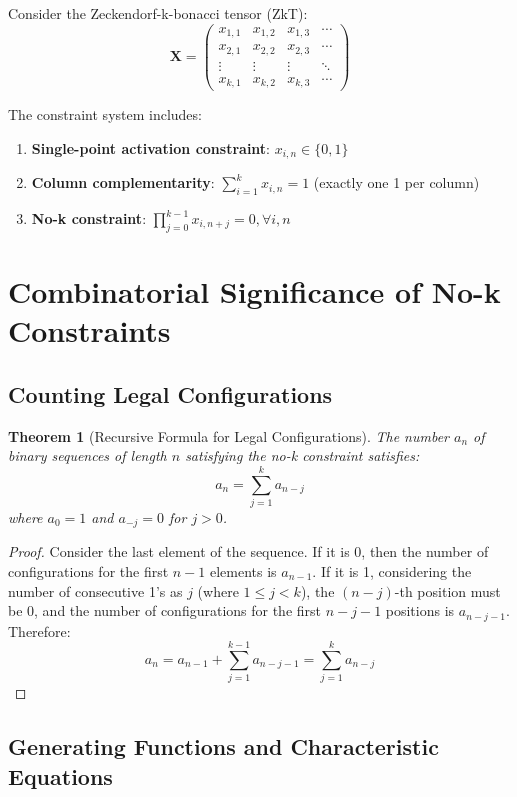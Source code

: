 \documentclass[12pt]{article}
\newtheorem{theorem}{Theorem}[section]
\begin{document}
Consider the Zeckendorf-k-bonacci tensor (ZkT):
$$\mathbf{X} = \begin{pmatrix}
x_{1,1} & x_{1,2} & x_{1,3} & \cdots \\
x_{2,1} & x_{2,2} & x_{2,3} & \cdots \\
\vdots & \vdots & \vdots & \ddots \\
x_{k,1} & x_{k,2} & x_{k,3} & \cdots
\end{pmatrix}$$

The constraint system includes:
\begin{enumerate}
\item \textbf{Single-point activation constraint}: $x_{i,n} \in \{0,1\}$
\item \textbf{Column complementarity}: $\sum_{i=1}^k x_{i,n} = 1$ (exactly one 1 per column)
\item \textbf{No-k constraint}: $\prod_{j=0}^{k-1} x_{i,n+j} = 0, \forall i,n$
\end{enumerate}

\section{Combinatorial Significance of No-k Constraints}

\subsection{Counting Legal Configurations}

\begin{theorem}[Recursive Formula for Legal Configurations]
The number $a_n$ of binary sequences of length $n$ satisfying the no-k constraint satisfies:
$$a_n = \sum_{j=1}^{k} a_{n-j}$$
where $a_0 = 1$ and $a_{-j} = 0$ for $j > 0$.
\end{theorem}

\begin{proof}
Consider the last element of the sequence. If it is 0, then the number of configurations for the first $n-1$ elements is $a_{n-1}$. If it is 1, considering the number of consecutive 1's as $j$ (where $1 \leq j < k$), the $(n-j)$-th position must be 0, and the number of configurations for the first $n-j-1$ positions is $a_{n-j-1}$. Therefore:
$$a_n = a_{n-1} + \sum_{j=1}^{k-1} a_{n-j-1} = \sum_{j=1}^{k} a_{n-j}$$
\end{proof}

\subsection{Generating Functions and Characteristic Equations}
\end{document}
